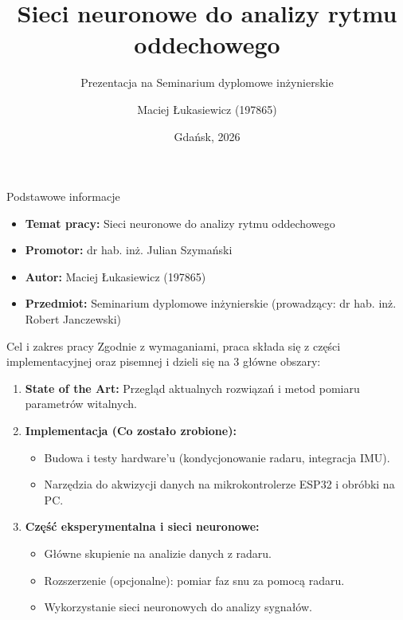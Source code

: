 \documentclass{beamer}
\title[Sieci neuronowe - rytm oddechowy]{Sieci neuronowe do analizy rytmu oddechowego}
\subtitle{Prezentacja na Seminarium dyplomowe inżynierskie}
\author[M. Łukasiewicz]{Maciej Łukasiewicz (197865)}
\institute[]{Politechnika Gdańska}
\date{Gdańsk, 2026}
\begin{document}
\begin{frame}
    \titlepage
\end{frame}

\begin{frame}{Podstawowe informacje}
    \begin{itemize}
        \item \textbf{Temat pracy:} Sieci neuronowe do analizy rytmu oddechowego
        \item \textbf{Promotor:} dr hab. inż. Julian Szymański
        \item \textbf{Autor:} Maciej Łukasiewicz (197865)
        \item \textbf{Przedmiot:} Seminarium dyplomowe inżynierskie (prowadzący: dr hab. inż. Robert Janczewski)
    \end{itemize}
\end{frame}

\begin{frame}{Cel i zakres pracy}
    Zgodnie z wymaganiami, praca składa się z części implementacyjnej oraz pisemnej i dzieli się na 3 główne obszary:
    \begin{enumerate}
        \item \textbf{State of the Art:} Przegląd aktualnych rozwiązań i metod pomiaru parametrów witalnych.
        \item \textbf{Implementacja (Co zostało zrobione):} 
        \begin{itemize}
            \item Budowa i testy hardware'u (kondycjonowanie radaru, integracja IMU).
            \item Narzędzia do akwizycji danych na mikrokontrolerze ESP32 i obróbki na PC.
        \end{itemize}
        \item \textbf{Część eksperymentalna i sieci neuronowe:} 
        \begin{itemize}
            \item Główne skupienie na analizie danych z radaru.
            \item Rozszerzenie (opcjonalne): pomiar faz snu za pomocą radaru.
            \item Wykorzystanie sieci neuronowych do analizy sygnałów.
        \end{itemize}
    \end{enumerate}
\end{frame}
\end{document}
